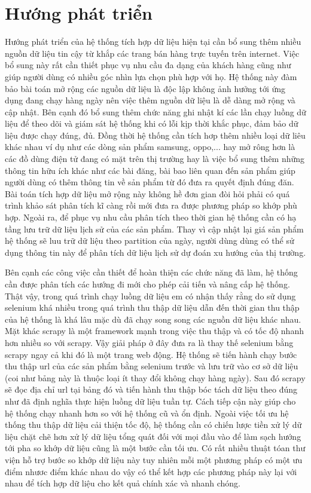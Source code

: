 \documentclass[../DoAn.tex]{subfiles}
\begin{document}
\section{Hướng phát triển}

Hướng phát triển của hệ thống tích hợp dữ liệu hiện tại cần bổ sung thêm nhiều nguồn dữ liệu tin cậy từ khắp các trang bán hàng trực tuyến trên internet. Việc bổ sung này rất cần thiết phục vụ nhu cầu đa dạng của khách hàng cũng như giúp người dùng có nhiều góc nhìn lựa chọn phù hợp với họ. Hệ thống này đàm bảo bài toán mở rộng các nguồn dữ liệu là độc lập không ảnh hưởng tới ứng dụng đang chạy hàng ngày nên việc thêm nguồn dữ liệu là dễ dàng mở rộng và cập nhật. Bên cạnh đó bổ sung thêm chức năng ghi nhật kí các lần chạy luồng dữ liệu để theo dõi và giám sát hệ thống khi có lỗi kịp thời khắc phục, đảm bảo dữ liệu được chạy đúng, đủ. Đồng thời hệ thống cần tích hơp thêm nhiều loại dữ liêu khác nhau ví dụ như các dòng sản phẩm samsung, oppo,... hay mở rông hơn là các đồ dùng điện tử đang có mặt trên thị trường hay là việc bổ sung thêm những thông tin hữu ích khác như các bài đăng, bài bao liên quan đến sản phẩm giúp người dùng có thêm thông tin về sản phẩm từ đó đưa ra quyết định đúng đăn. Bài toán tích hợp dữ liệu mở rộng này không hề đơn gian đòi hỏi phải có quá trình khảo sát phân tích kĩ càng rồi mới đưa ra được phương pháp so khớp phù hợp. Ngoài ra, để phục vụ nhu cầu phân tích theo thời gian hệ thống cần có hạ tầng lưu trữ dữ liệu lịch sử của các sản phẩm.
Thay vì cập nhật lại giá sản phẩm hệ thống sẽ luu trữ dữ liệu theo partition của ngày, người dùng dùng có thể sử dụng thông tin này để phân tích dữ liệu lịch sử dự đoán xu hướng của thị trường.

Bên cạnh các công việc cần thiết để hoàn thiện các chức năng đã làm, hệ thống cần được phân tích các hướng đi mới cho phép cải tiến và nâng cấp hệ thống. Thật vậy, trong quá trình chạy luồng dữ liệu em có nhận thấy rằng do sử dụng selenium khá nhiều trong quá trình thu thập dữ liệu dẫn đến thời gian thu thập của hệ thống là khá lâu mặc dù đã chạy song song các nguồn dữ liệu khác nhau. Mặt khác scrapy là một framework mạnh trong việc thu thập và có tốc độ nhanh hơn nhiều so với scrapy. Vậy giải pháp ở đây đưa ra là thay thế selenium bằng scrapy ngay cả khi đó là một trang web động. Hệ thống sẽ tiến hành chạy bước thu thập url của các sản phẩm bằng selenium trước và lưu trữ vào cơ sở dữ liệu (coi như bảng này là thuộc loại ít thay đổi không chạy hàng ngày). Sau đó scrapy sẽ đọc địa chỉ url tại bảng đó và tiến hành thu thập bóc tách dữ liệu theo đúng như đã định nghĩa thực hiện luồng dữ liệu tuần tự. Cách tiếp cận này giúp cho hệ thống chạy nhanh hơn so với hệ thống cũ và ổn định. Ngoài việc tối ưu hệ thống thu thập dữ liệu cải thiện tốc độ, hệ thống cần có chiến lược tiền xử lý dữ liệu chặt chẽ hơn xử lý dữ liệu tổng quát đối với mọi đầu vào để làm sạch hướng tới pha so khớp dữ liệu cũng là một bước cần tối ưu. Có rất nhiều thuật tóan thư viện hỗ trợ bước so khớp dữ liệu này tuy nhiên mỗi một phương pháp có một ưu điểm nhươc điểm khác nhau do vậy có thể kết hợp các phương pháp này lại với nhau để tích hợp dữ liệu cho kết quả chính xác và nhanh chóng.
\end{document}
